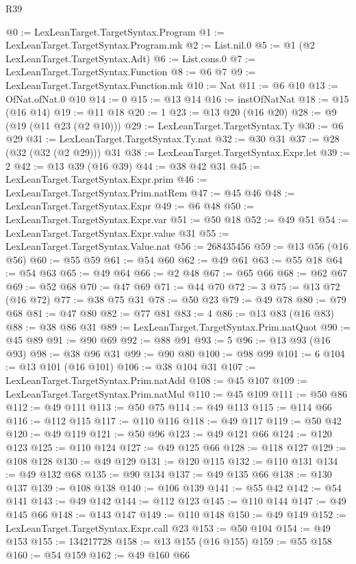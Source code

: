 \begin{lexlean}{R39}
\begin{coremodule}
@0 := LexLeanTarget.TargetSyntax.Program
@1 := LexLeanTarget.TargetSyntax.Program.mk
@2 := List.nil.{0}
@5 := @1 (@2 LexLeanTarget.TargetSyntax.Adt)
@6 := List.cons.{0}
@7 := LexLeanTarget.TargetSyntax.Function
@8 := @6 @7
@9 := LexLeanTarget.TargetSyntax.Function.mk
@10 := Nat
@11 := @6 @10
@13 := OfNat.ofNat.{0} @10
@14 := 0
@15 := @13 @14
@16 := instOfNatNat
@18 := @15 (@16 @14)
@19 := @11 @18
@20 := 1
@23 := @13 @20 (@16 @20)
@28 := @9 (@19 (@11 @23 (@2 @10)))
@29 := LexLeanTarget.TargetSyntax.Ty
@30 := @6 @29
@31 := LexLeanTarget.TargetSyntax.Ty.nat
@32 := @30 @31
@37 := @28 (@32 (@32 (@2 @29))) @31
@38 := LexLeanTarget.TargetSyntax.Expr.let
@39 := 2
@42 := @13 @39 (@16 @39)
@44 := @38 @42 @31
@45 := LexLeanTarget.TargetSyntax.Expr.prim
@46 := LexLeanTarget.TargetSyntax.Prim.natRem
@47 := @45 @46
@48 := LexLeanTarget.TargetSyntax.Expr
@49 := @6 @48
@50 := LexLeanTarget.TargetSyntax.Expr.var
@51 := @50 @18
@52 := @49 @51
@54 := LexLeanTarget.TargetSyntax.Expr.value @31
@55 := LexLeanTarget.TargetSyntax.Value.nat
@56 := 268435456
@59 := @13 @56 (@16 @56)
@60 := @55 @59
@61 := @54 @60
@62 := @49 @61
@63 := @55 @18
@64 := @54 @63
@65 := @49 @64
@66 := @2 @48
@67 := @65 @66
@68 := @62 @67
@69 := @52 @68
@70 := @47 @69
@71 := @44 @70
@72 := 3
@75 := @13 @72 (@16 @72)
@77 := @38 @75 @31
@78 := @50 @23
@79 := @49 @78
@80 := @79 @68
@81 := @47 @80
@82 := @77 @81
@83 := 4
@86 := @13 @83 (@16 @83)
@88 := @38 @86 @31
@89 := LexLeanTarget.TargetSyntax.Prim.natQuot
@90 := @45 @89
@91 := @90 @69
@92 := @88 @91
@93 := 5
@96 := @13 @93 (@16 @93)
@98 := @38 @96 @31
@99 := @90 @80
@100 := @98 @99
@101 := 6
@104 := @13 @101 (@16 @101)
@106 := @38 @104 @31
@107 := LexLeanTarget.TargetSyntax.Prim.natAdd
@108 := @45 @107
@109 := LexLeanTarget.TargetSyntax.Prim.natMul
@110 := @45 @109
@111 := @50 @86
@112 := @49 @111
@113 := @50 @75
@114 := @49 @113
@115 := @114 @66
@116 := @112 @115
@117 := @110 @116
@118 := @49 @117
@119 := @50 @42
@120 := @49 @119
@121 := @50 @96
@123 := @49 @121 @66
@124 := @120 @123
@125 := @110 @124
@127 := @49 @125 @66
@128 := @118 @127
@129 := @108 @128
@130 := @49 @129
@131 := @120 @115
@132 := @110 @131
@134 := @49 @132 @68
@135 := @90 @134
@137 := @49 @135 @66
@138 := @130 @137
@139 := @108 @138
@140 := @106 @139
@141 := @55 @42
@142 := @54 @141
@143 := @49 @142
@144 := @112 @123
@145 := @110 @144
@147 := @49 @145 @66
@148 := @143 @147
@149 := @110 @148
@150 := @49 @149
@152 := LexLeanTarget.TargetSyntax.Expr.call @23
@153 := @50 @104
@154 := @49 @153
@155 := 134217728
@158 := @13 @155 (@16 @155)
@159 := @55 @158
@160 := @54 @159
@162 := @49 @160 @66

\end{coremodule}
\end{lexlean}
